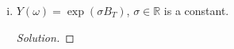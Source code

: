 \documentclass[11pt,letterpaper]{report}
\newcommand{\reals}{\mathbb{R}}
\newenvironment{solution}
{\begin{proof}[Solution]}
{\end{proof}}
\begin{document}
\begin{enumerate}[(a)]
\begin{enumerate}[(i)]
		\item $Y(\omega) = \exp(\sigma B_T)$, $\sigma \in \reals$ is a constant.
		\begin{solution}
			
		\end{solution}
	\end{enumerate}
\end{enumerate}
\end{document}
